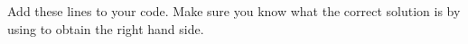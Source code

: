   Add these lines to your code. Make sure you know what the correct
  solution is by using  to obtain the right hand side.
